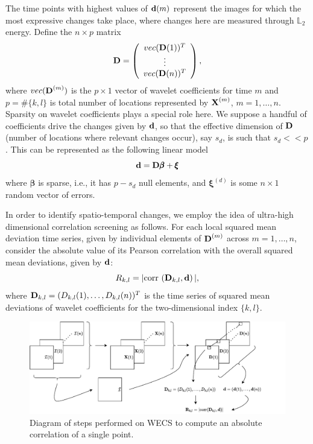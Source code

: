 \documentclass[journal]{IEEEtran}
\def\corr{\mbox{{\rm corr\,}}}
\newcommand{\vbeta}{\pmb{\beta}}
\newcommand{\vxi}{\pmb{\xi}}
\newcommand{\vD}{{\textbf D}}
\newcommand{\vd}{{\textbf d}}
\newcommand{\vX}{{\textbf X}}
\begin{document}
The time points with highest values of $\vd(m)$ represent the images for which the most expressive changes take place, where changes here are measured through $\mathbb{L}_2$ energy. Define the  $n\times p$ matrix
\begin{equation*}
 \vD=\left(
 \begin{array}{c}
 vec(\vD(1))^T\\
 \vdots\\
 vec(\vD(n))^T\\
 \end{array}
 \right),
\label{eq_defmatrixD}
\end{equation*}
where $vec(\vD^{(m)})$ is the $p\times 1$ vector of wavelet coefficients for time $m$ and $p=\#\{k,l\}$ is total number of locations represented by $\vX^{(m)}$, $m=1,\ldots,n$. Sparsity \cite{johnstone2009statistical} on wavelet coefficients plays a special role here.  We suppose a handful of coefficients drive the changes given by $\vd$, so that the effective dimension of $\vD$ (number of locations where relevant changes occur), say $s_d$, is such that $s_d<<p$. This can be represented as the following linear model
\begin{equation} 
\vd=\vD\vbeta+\vxi
\label{E:sparsemodel_d}
\end{equation}
where $\vbeta$ is sparse, i.e., it has $p-s_d$ null elements, and $\vxi^{(d)}$ is some $n\times 1$ random vector of errors.

In order to identify spatio-temporal changes, we employ the idea of ultra-high dimensional correlation screening \cite{fan2020statistical} as follows. For each local squared mean deviation time series, given by individual elements of $\vD^{(m)}$ across $m=1,\ldots,n$, consider the absolute value of its Pearson correlation with the overall squared mean deviations, given by $\vd$:
\begin{equation*}
R_{k,l}= |\corr\left( \vD_{k,l}, \vd\right)|,
\label{def_Rkld}
\end{equation*}
where $\vD_{k,l}=(D_{k,l}(1),\ldots,D_{k,l}(n))^T$ is the time series of squared mean deviations of wavelet coefficients for the two-dimensional index $\{k,l\}$.


\begin{figure}[htb!]
\centering
\includegraphics[scale=.45]{../../drawio/diagram_wecs.drawio}
\caption{Diagram of steps performed on WECS to compute an absolute correlation of a single point.}
\label{F:EllipsoidChanges}
\end{figure}
\end{document}
